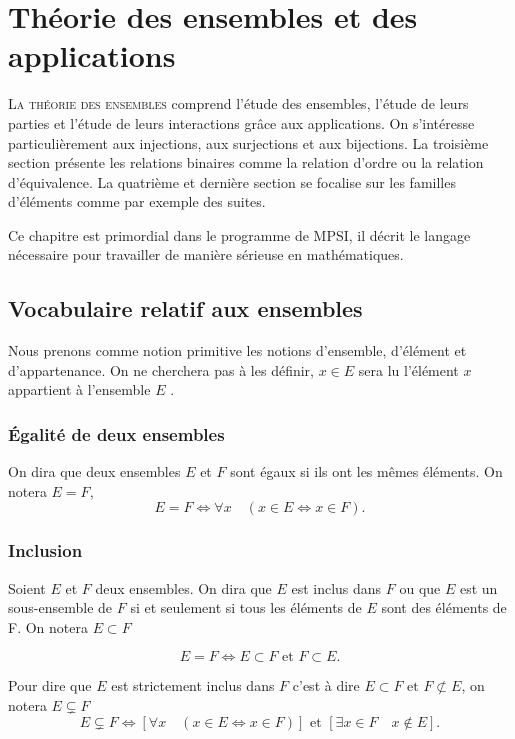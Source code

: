 \chapter{Théorie des ensembles et des applications}
\label{chap:ensembles}
\minitoc
\minilof
\minilot
\lettrine{L}{a théorie des ensembles} comprend l'étude des ensembles, l'étude de leurs parties et l'étude de leurs interactions grâce aux applications. On s'intéresse particulièrement aux injections, aux surjections et aux bijections. La troisième section présente les relations binaires comme la relation d'ordre ou la relation d'équivalence. La quatrième et dernière section se focalise sur les familles d'éléments comme par exemple des suites. 

Ce chapitre est primordial dans le programme de MPSI, il décrit le langage nécessaire pour travailler de manière sérieuse en mathématiques.
%
\section{Vocabulaire relatif aux ensembles}
\label{chap3-sec:vocabensemble}
Nous prenons comme notion primitive les notions d'ensemble, d'élément et d'appartenance. On ne cherchera pas à les définir, \og$x \in E$\fg{} sera lu \og l'élément $x$ appartient à l'ensemble $E$ \fg{}.
%
\subsection{Égalité de deux ensembles}
\label{chap3-subsec:egalitededeuxensembles}
\begin{defdef}
  On dira que deux ensembles $E$ et $F$ sont égaux si ils ont les mêmes éléments. On notera $E=F$,
  \begin{equation}
    E=F \iff \forall x \quad \left(x \in E \iff x \in F \right).
  \end{equation}
\end{defdef}
%
\subsection{Inclusion}
\label{chap3-subsec:inclusion}
\begin{defdef}
  Soient $E$ et $F$ deux ensembles. On dira que $E$ est inclus dans $F$ ou que $E$ est un sous-ensemble de $F$ si et seulement si tous les éléments de $E$ sont des éléments de F. On notera $E \subset F$
\end{defdef}
\begin{prop} 
  \begin{equation}
    E=F \iff E \subset F \text{~et~} F \subset E.
  \end{equation}
\end{prop}
Pour dire que $E$ est strictement inclus dans $F$ c'est à dire $E \subset F \text{~et~} F \not\subset E$, on notera $E \subsetneq F$
\begin{equation}
  E \subsetneq F \iff \left[\forall x \quad \left(x \in E \iff x \in F \right) \right] \text{~et~} \left[\exists x \in F \quad x \not\in E \right].
\end{equation}
%
